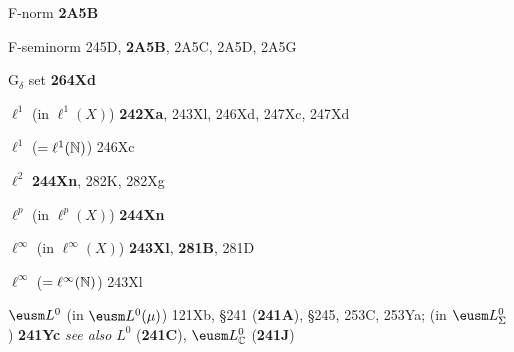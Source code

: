F-norm {\bf 2A5B}


F-seminorm 245D, {\bf 2A5B}, 2A5C, 2A5D, 2A5G 


\indexmedskip
{}

G$_{\delta}$ set {\bf 264Xd}































































\indexmedskip
{}



$\ell^1$ (in $\ell^1(X)$) {\bf 242Xa}, 243Xl, 246Xd, 247Xc,
247Xd


$\ell^1$ ($=\ell^1(\Bbb N)$) 246Xc


$\ell^2$ {\bf 244Xn}, 282K, 282Xg


$\ell^p$ (in $\ell^p(X)$) {\bf 244Xn}


$\ell^{\infty}$ (in $\ell^{\infty}(X)$) {\bf 243Xl}, {\bf 281B}, 281D


$\ell^{\infty}$ ($=\ell^{\infty}(\Bbb N)$) 243Xl












$\eusm L^0$ (in $\eusm L^0(\mu)$) 121Xb,
  \S241 ({\bf 241A}), \S245, 253C, 253Ya;
  (in $\eusm L^0_{\Sigma}$) {\bf 241Yc}
  {\it see also} $L^0$ ({\bf 241C}),
$\eusm L^0_{\Bbb C}$ ({\bf 241J})



